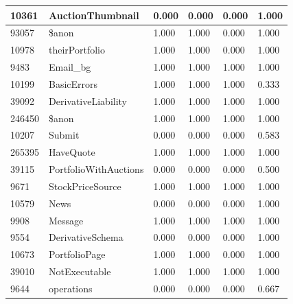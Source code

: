 \documentclass[a4paper]{article}
\newlength{\DUtablewidth} %
\begin{document}
\begin{longtable*}[c]{|p{0.160\DUtablewidth}|p{0.160\DUtablewidth}|p{0.160\DUtablewidth}|p{0.160\DUtablewidth}|p{0.160\DUtablewidth}|p{0.160\DUtablewidth}|}
10361
 & 
AuctionThumbnail
 & 
0.000
 & 
0.000
 & 
0.000
 & 
1.000
 \\
\hline

93057
 & 
\$anon
 & 
1.000
 & 
1.000
 & 
0.000
 & 
1.000
 \\
\hline

10978
 & 
theirPortfolio
 & 
1.000
 & 
1.000
 & 
0.000
 & 
1.000
 \\
\hline

9483
 & 
Email\_bg
 & 
1.000
 & 
1.000
 & 
1.000
 & 
1.000
 \\
\hline

10199
 & 
BasicErrors
 & 
1.000
 & 
1.000
 & 
1.000
 & 
0.333
 \\
\hline

39092
 & 
DerivativeLiability
 & 
1.000
 & 
1.000
 & 
1.000
 & 
1.000
 \\
\hline

246450
 & 
\$anon
 & 
1.000
 & 
1.000
 & 
1.000
 & 
1.000
 \\
\hline

10207
 & 
Submit
 & 
0.000
 & 
0.000
 & 
0.000
 & 
0.583
 \\
\hline

265395
 & 
HaveQuote
 & 
1.000
 & 
1.000
 & 
1.000
 & 
1.000
 \\
\hline

39115
 & 
PortfolioWithAuctions
 & 
0.000
 & 
0.000
 & 
0.000
 & 
0.500
 \\
\hline

9671
 & 
StockPriceSource
 & 
1.000
 & 
1.000
 & 
1.000
 & 
1.000
 \\
\hline

10579
 & 
News
 & 
0.000
 & 
0.000
 & 
0.000
 & 
1.000
 \\
\hline

9908
 & 
Message
 & 
1.000
 & 
1.000
 & 
1.000
 & 
1.000
 \\
\hline

9554
 & 
DerivativeSchema
 & 
0.000
 & 
0.000
 & 
0.000
 & 
1.000
 \\
\hline

10673
 & 
PortfolioPage
 & 
1.000
 & 
1.000
 & 
0.000
 & 
1.000
 \\
\hline

39010
 & 
NotExecutable
 & 
1.000
 & 
1.000
 & 
1.000
 & 
1.000
 \\
\hline

9644
 & 
operations
 & 
0.000
 & 
0.000
 & 
0.000
 & 
0.667
 \\
\hline


\end{longtable*}
\end{document}
